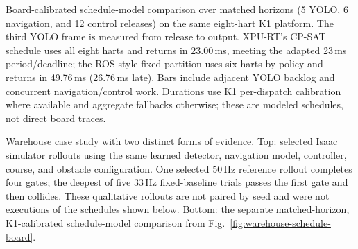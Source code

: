 \caption{Board-calibrated schedule-model comparison over matched horizons
(5 YOLO, 6 navigation, and 12 control releases) on the same eight-hart K1
platform. The third YOLO frame is measured from release to output. XPU-RT's
CP-SAT schedule uses all eight harts and returns in 23.00\,ms, meeting the
adapted 23\,ms period/deadline; the ROS-style fixed partition uses six harts
by policy and returns in 49.76\,ms (26.76\,ms late). Bars include adjacent
YOLO backlog and concurrent navigation/control work. Durations use K1
per-dispatch calibration where available and aggregate fallbacks otherwise;
these are modeled schedules, not direct board traces.}
\label{fig:warehouse-schedule-board}

\caption{Warehouse case study with two distinct forms of evidence. Top:
selected Isaac simulator rollouts using the same learned detector, navigation
model, controller, course, and obstacle configuration. One selected 50\,Hz
reference rollout completes four gates; the deepest of five 33\,Hz
fixed-baseline trials passes the first gate and then collides. These qualitative
rollouts are not paired by seed and were not executions of the schedules shown
below. Bottom: the separate matched-horizon, K1-calibrated schedule-model
comparison from Fig.~\ref{fig:warehouse-schedule-board}.}
\label{fig:warehouse-showdown-board}
